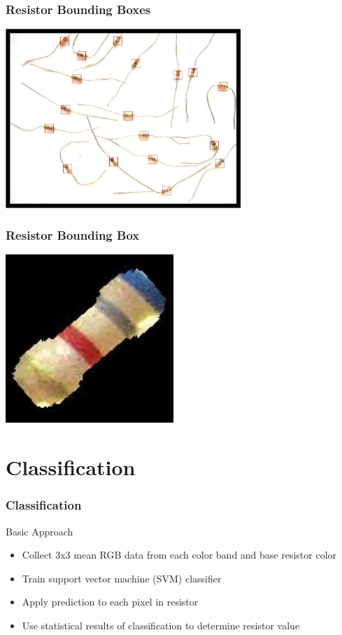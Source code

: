 \documentclass{beamer}
\begin{document}

\begin{frame}
\frametitle{Resistor Bounding Boxes}
\begin{center}
\includegraphics[width=3.5in]{images/bbs.jpg}
\end{center}
\end{frame}


\begin{frame}
\frametitle{Resistor Bounding Box}
\begin{center}
\includegraphics[width=2.5in]{images/bb.jpg}
\end{center}
\end{frame}

\section{Classification}

\begin{frame}
\frametitle{Classification}
\begin{block}{Basic Approach}
\begin{itemize}
\item Collect 3x3 mean RGB data from each color band and base resistor color 
\item Train support vector machine (SVM) classifier
\item Apply prediction to each pixel in resistor
\item Use statistical results of classification to determine resistor value
\end{itemize}
\end{block}
\end{frame}
\end{document}
